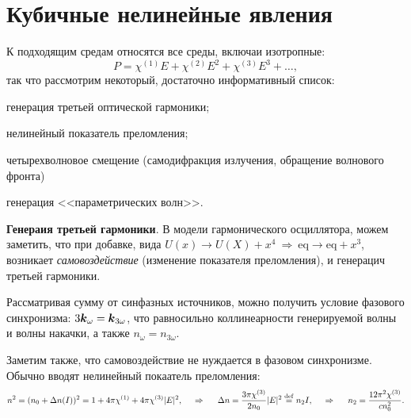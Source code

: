\section{Кубичные нелинейные явления}



К подходящим средам относятся все среды, включаи изотропные:
\begin{equation*}
    P = \chi^{(1)} E + \chi^{(2)} E^2 + \chi^{(3)} E^3 + \ldots,
\end{equation*}
так что рассмотрим некоторый, достаточно информативный список:
\vspace{-2mm}
\begin{itemize*}
    \item генерация третьей оптической гармоники;
    \item нелинейный показатель преломления;
    \item четырехволновое смещение (самодифракция излучения, обращение волнового фронта)
    \item генерация <<параметрических волн>>. 
\end{itemize*}


\textbf{Генераия третьей гармоники}.  В модели гармонического осциллятора, можем заметить, что при добавке, вида $U(x) \to U(X) + x^4 \ \Rightarrow \ \text{eq} \to \text{eq}+ x^3$, возникает \textit{самовоздействие} (изменение показателя преломления), и генерацич третьей гармоники. 


Рассматривая сумму от синфазных источников, можно получить условие фазового синхронизма: $3 \mbox{\boldmath $k$}_{\omega} = \mbox{\boldmath $k$}_{3 \omega}$, что равносильно коллинеарности генерируемой волны и волны накачки, а также $n_\omega = n_{3 \omega}$. 


Заметим также, что самовоздействие не нуждается в фазовом синхронизме. Обычно вводят нелинейный покаатель преломления:
\begin{equation*}
    n^2 = (n_0 + \Delta n(I))^2 = 1 + 4 \pi \chi^{(1)} + 4 \pi \chi^{(3)} |E|^2,
    \hspace{0.5cm} \Rightarrow \hspace{0.5cm}
    \Delta n = \frac{3 \pi \chi^{(3)}}{2 n_0} |E|^2 \overset{\mathrm{def}}{=} n_2 I,
    \hspace{0.5cm} \Rightarrow \hspace{0.5cm}
    n_2 = \frac{12 \pi^2 \chi^{(3)}}{c n_0^2}.
\end{equation*}

